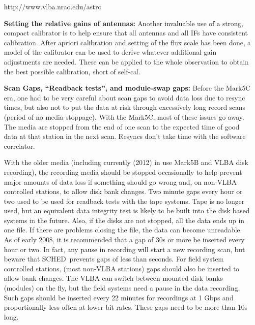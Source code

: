 \documentclass{report}
\newcommand{\schedb}{{\sc SCHED~}}
\begin{document}
\begin{list}{}{\parsep .5em  \itemsep .5em }
{http://www.vlba.nrao.edu/astro}

\item {\bf Setting the relative gains of antennas:}  Another invaluable
use of a strong, compact calibrator is to help ensure that all antennas
and all IFs have consistent calibration.  After apriori calibration
and setting of the flux scale has been done, a model of the calibrator
can be used to derive whatever additional gain adjustments are needed.
These can be applied to the whole observation to obtain the best possible
calibration, short of self-cal.


\item {\bf Scan Gaps, ``Readback tests'', and module-swap gaps:}  Before
the Mark5C era, one had to be very careful about scan gaps to avoid
data loss due to resync times, but also not to put the data at risk
through excessively long record scans (period of no media stoppage).  With
the Mark5C, most of these issues go away.  The media are stopped from
the end of one scan to the expected time of good data at that station
in the next scan.  Resyncs don't take time with the software correlator.

With the older media (including currently (2012) in use Mark5B and
VLBA disk recording), the recording media should be stopped
occasionally to help prevent major amounts of data loss if something
should go wrong and, on non-VLBA controlled stations, to allow disk
bank changes.  Two minute gaps every hour or two used to be used for
readback tests with the tape systems.  Tape is no longer used, but an
equivalent data integrity test is likely to be built into the disk
based systems in the future.  Also, if the disks are not stopped, all
the data ends up in one file. If there are problems closing the file,
the data can become unreadable.  As of early 2008, it is recommended
that a gap of 30s or more be inserted every hour or two.  In fact, any
pause in recording will start a new recording scan, but beware that
\schedb prevents gaps of less than  seconds.  For field system controlled
stations, (most non-VLBA stations) gaps should also be inserted to
allow bank changes.  The VLBA can switch between mounted disk banks
(modules) on the fly, but the field systems need a pause in the data
recording.  Such gaps should be inserted every 22 minutes for
recordings at 1 Gbps and proportionally less often at lower bit rates.
These gaps need to be more than 10s long.



\end{list}
\end{document}
